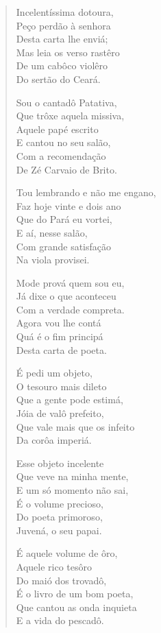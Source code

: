 \begin{verse}
Incelentíssima dotoura,\\
Peço perdão à senhora\\
Desta carta lhe enviá;\\
Mas leia os verso rastêro\\
De um cabôco violêro\\
Do sertão do Ceará.

Sou o cantadô Patativa,\\
Que trôxe aquela missiva,\\
Aquele papé escrito\\
E cantou no seu salão,\\
Com a recomendação\\
De Zé Carvaio de Brito.

Tou lembrando e não me engano,\\
Faz hoje vinte e dois ano\\
Que do Pará eu vortei,\\
E aí, nesse salão,\\
Com grande satisfação\\
Na viola provisei.

Mode prová quem sou eu,\\
Já dixe o que aconteceu\\
Com a verdade compreta.\\
Agora vou lhe contá\\
Quá é o fim principá\\
Desta carta de poeta.

É pedi um objeto,\\
O tesouro mais dileto\\
Que a gente pode estimá,\\
Jóia de valô prefeito,\\
Que vale mais que os infeito\\
Da corôa imperiá.

Esse objeto incelente\\
Que veve na minha mente,\\
E um só momento não sai,\\
É o volume precioso,\\
Do poeta primoroso,\\
Juvená, o seu papai.

É aquele volume de ôro,\\
Aquele rico tesôro\\
Do maió dos trovadô,\\
É o livro de um bom poeta,\\
Que cantou as onda inquieta\\
E a vida do pescadô.


\end{verse}
